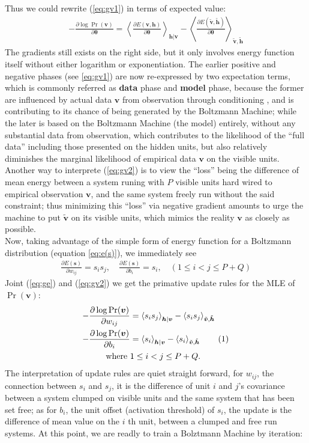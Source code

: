 \documentclass[11pt]{article}
\newcommand{\mean}[2]{\left\langle{#1}\right\rangle_{#2}}
\newcommand\numberthis{\addtocounter{equation}{1}\tag{\theequation}}
\newcommand{\vh}{\boldsymbol{h}}
\newcommand{\vv}{\boldsymbol{v}}
\newcommand{\vs}{\boldsymbol{s}}
\newcommand{\vht}{\tilde{\vh}}
\newcommand{\vvt}{\tilde{\vv}}
\newcommand{\pEC}{\boldsymbol{\theta}}
\newcommand{\PDV}[2]{\frac{\partial #1}{\partial #2}}
\begin{document}
Thus we could rewrite ({\ref{eq:gv1}) in terms of expected value:
\begin{align} \label{eq:gv2}
  -\PDV{\log{\Pr(\vv)}}{\pEC} = \mean{\PDV{E(\vv, \vh)}{\pEC}}{\vh|\vv} - \mean{\PDV{E(\vvt, \vht)}{\pEC}}{\vvt, \vht}
\end{align}
The gradients still exists on the right side, but it only involves energy function itself without either logarithm or exponentiation. The earlier positive and negative phases (see \ref{eq:gv1}) are now re-expressed by two expectation terms, which is commonly referred as \textbf{data} phase and \textbf{model} phase, because the former are influenced by actual data $\vv$ from observation through conditioning , and is contributing to its chance of being generated by the Boltzmann Machine; while the later is based on the Boltzmann Machine (the model) entirely, without any substantial data from observation, which contributes to the likelihood of the ``full data'' including those presented on the hidden units, but also relatively diminishes the marginal likelihood of empirical data $\vv$ on the visible units. \\
Another way to interprete (\ref{eq:gv2}) is to view the ``loss'' being the difference of mean energy between a system runing with $P$ visible units hard wired to empirical observation $\vv$, and the same system freely run without the said constraint; thus minimizing this ``loss'' via negative gradient amounts to urge the machine to put $\vvt$ on its visible units, which mimics the reality $\vv$ as closely as possible. \\
Now, taking advantage of the simple form of energy function for a Boltzmann distribution (equation \ref{eq:e(s)}), we immediately see
\begin{align} \label{eq:ge}
  \PDV{E(\vs)}{w_{ij}} = s_i s_j,  \quad \PDV{E(\vs)}{b_i} = s_i, \quad  (1 \le i < j \le P+Q)
\end{align}
Joint (\ref{eq:ge}) and (\ref{eq:gv2}) we get the primative update rules for the MLE of $\Pr(\vv)$:
\begin{align*} \label{eq:gv3}
  -\PDV{\log{\Pr(\vv)}}{w_{ij}} &= \mean{s_i s_j}{\vh|\vv} - \mean{s_i s_j}{\vvt, \vht} \\
  -\PDV{\log{\Pr(\vv)}}{b_i}    &= \mean{s_i}{\vh|\vv} - \mean{s_i}{\vvt, \vht} \numberthis \\
  \textrm{where }               & 1 \le i < j \le P+Q.
\end{align*}
The interpretation of update rules are quiet straight forward, for $w_{ij}$, the connection between $s_i$ and $s_j$, it is the difference of unit $i$ and $j$'s covariance between a system clumped on visible units and the same system that has been set free; as for $b_i$, the unit offset (activation threshold) of $s_i$, the update is the difference of mean value on the $i$ th unit, between a clumped and free run systems. At this point, we are readly to train a Bolztmann Machine by iteration:
}
\end{document}
